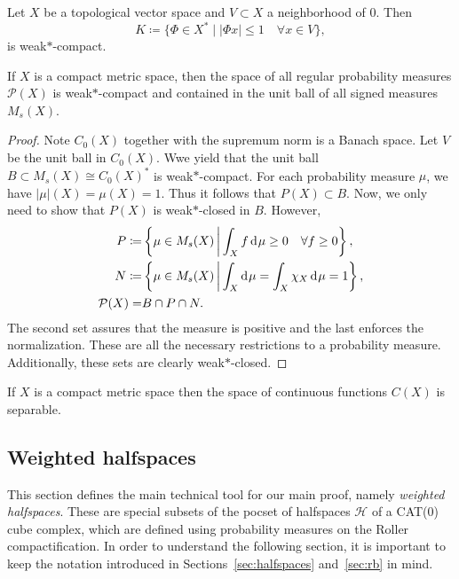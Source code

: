 \begin{thm}
  Let \(X\) be a topological vector space and \(V \subset X\) a neighborhood of \(0\). Then
  \[
    K \coloneqq \{ \Phi \in X^\ast \mid |\Phi x| \leq 1 \quad \forall x \in V\},
  \]
  is weak\(\ast\)-compact.
\end{thm}

\begin{cor}
  \label{cor:banach-alaoglu}
  If \(X\) is a compact metric space, then the space of all regular probability measures \(\mathcal{P}(X)\) is weak\(\ast\)-compact and contained in the unit ball of all signed measures \(M_{s}(X)\).
\end{cor}

\begin{proof}
  Note \(C_0(X)\) together with the supremum norm is a Banach space. Let \(V\) be the unit ball in \(C_0(X)\). Wwe yield that the unit ball \(B \subset M_s(X) \cong C_0(X)^\ast\) is weak\(\ast\)-compact. For each probability measure \(\mu\), we have \(|\mu|(X) = \mu(X) = 1\). Thus it follows that \(P(X) \subset B\). Now, we only need to show that \(P(X)\) is weak\(\ast\)-closed in \(B\). However,
  \begin{align*}
    P \coloneqq & \left\{\mu \in M_s(X) \relmid \int_X f \d\mu \geq 0 \quad \forall f \geq 0\right\},\\
    N \coloneqq & \left\{\mu \in M_s(X) \relmid \int_X \d\mu = \int_X \chi_X \d\mu = 1\right\},\\
    \mathcal{P}(X)  = & B \cap P \cap N.
  \end{align*}
  The second set assures that the measure is positive and the last enforces the normalization. These are all the necessary restrictions to a probability measure. Additionally, these sets are clearly weak\(\ast\)-closed.
\end{proof}

\begin{lemma}
  \label{lem:continuous-separable}
  If \(X\) is a compact metric space then the space of continuous functions \(C(X)\) is separable.
\end{lemma}

\subsection{Weighted halfspaces}
\label{sec:weight}

This section defines the main technical tool for our main proof, namely \emph{weighted halfspaces}. These are special subsets of the pocset of halfspaces \(\mathcal{H}\) of a CAT(0) cube complex, which are defined using probability measures on the Roller compactification. In order to understand the following section, it is important to keep the notation introduced in Sections~\ref{sec:halfspaces} and~\ref{sec:rb} in mind.

